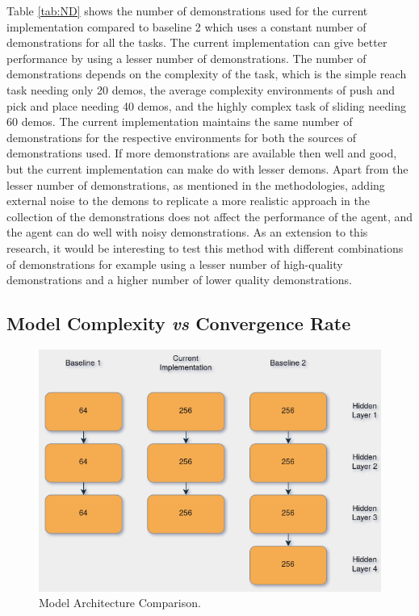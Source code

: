 Table \ref{tab:ND} shows the number of demonstrations used for the current implementation compared to baseline 2 which uses a constant number of demonstrations for all the tasks. The current implementation can give better performance by using a lesser number of demonstrations. The number of demonstrations depends on the complexity of the task, which is the simple reach task needing only 20 demos, the average complexity environments of push and pick and place needing 40 demos, and the highly complex task of sliding needing 60 demos. The current implementation maintains the same number of demonstrations for the respective environments for both the sources of demonstrations used. If more demonstrations are available then well and good, but the current implementation can make do with lesser demons. Apart from the lesser number of demonstrations, as mentioned in the methodologies, adding external noise to the demons to replicate a more realistic approach in the collection of the demonstrations does not affect the performance of the agent, and the agent can do well with noisy demonstrations. As an extension to this research, it would be interesting to test this method with different combinations of demonstrations for example using a lesser number of high-quality demonstrations and a higher number of lower quality demonstrations. \\

\subsection{Model Complexity \textit{vs} Convergence Rate}

\begin{figure}[h!]
    \centering
    \includegraphics[width=\textwidth]{images/MAC.png}
    \caption{Model Architecture Comparison.}
    \label{fig:MAC}
\end{figure}

